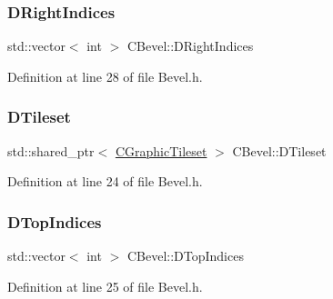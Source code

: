\hypertarget{classCBevel_a52160856e5fbb45c4c1d6e433089ab05}{}\label{classCBevel_a52160856e5fbb45c4c1d6e433089ab05} 
\subsubsection{\texorpdfstring{D\+Right\+Indices}{DRightIndices}}
{\footnotesize\ttfamily std\+::vector$<$ int $>$ C\+Bevel\+::\+D\+Right\+Indices\hspace{0.3cm}{\ttfamily [protected]}}



Definition at line 28 of file Bevel.\+h.

\hypertarget{classCBevel_a98cbd98b79bc8cffd408f12fee447fb9}{}\label{classCBevel_a98cbd98b79bc8cffd408f12fee447fb9} 
\subsubsection{\texorpdfstring{D\+Tileset}{DTileset}}
{\footnotesize\ttfamily std\+::shared\+\_\+ptr$<$ \hyperlink{classCGraphicTileset}{C\+Graphic\+Tileset} $>$ C\+Bevel\+::\+D\+Tileset\hspace{0.3cm}{\ttfamily [protected]}}



Definition at line 24 of file Bevel.\+h.

\hypertarget{classCBevel_a05e4406edf5927df6431f103f7207a1b}{}\label{classCBevel_a05e4406edf5927df6431f103f7207a1b} 
\subsubsection{\texorpdfstring{D\+Top\+Indices}{DTopIndices}}
{\footnotesize\ttfamily std\+::vector$<$ int $>$ C\+Bevel\+::\+D\+Top\+Indices\hspace{0.3cm}{\ttfamily [protected]}}



Definition at line 25 of file Bevel.\+h.

\hypertarget{classCBevel_a891dccc1828c48e5e7a475ca33080060}{}\label{classCBevel_a891dccc1828c48e5e7a475ca33080060} 
